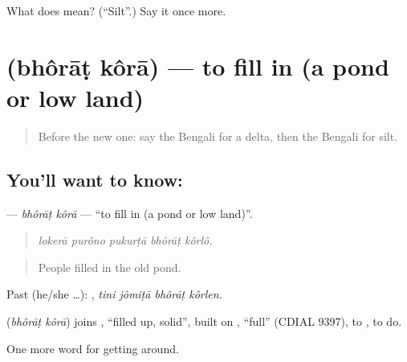 \begin{tcolorbox}[breakable,colback=teal!4,colframe=teal!35!black,title={Before you move on}]
What does  mean? (\textquotedblleft{}Silt\textquotedblright{}.) Say it once more.
\end{tcolorbox}
\section[\texorpdfstring{\bn{ভরাট} \bn{করা} (bhôrāṭ kôrā)}{ভরাট করা (bhôrāṭ kôrā)}]{  (bhôrāṭ kôrā) — to fill in (a pond or low land)}

\label{lesson:BN-C431-bhorat-kora}



\begin{quote}
Before the new one: say the Bengali for a delta, then the Bengali for silt.
\end{quote}

\subsection*{You'll want to know:  }
\textbf{ } — \emph{bhôrāṭ kôrā} — \textquotedblleft{}to fill in (a pond or low land)\textquotedblright{}.

\begin{quote}
    
\end{quote}

\begin{quote}
\emph{lokerā purôno pukurṭā bhôrāṭ kôrlô.}
\end{quote}

\begin{quote}
People filled in the old pond.
\end{quote}

Past (he/she …):    , \emph{tini jômiṭā bhôrāṭ kôrlen}.

\begin{cousinweb}
\textbf{ } (\emph{bhôrāṭ kôrā}) joins , \textquotedblleft{}filled up, solid\textquotedblright{}, built on \textbf{}, \textquotedblleft{}full\textquotedblright{} (CDIAL 9397), to , to do.
\end{cousinweb}

\begin{grammarlens}[title={What you've built}]
One more word for getting around.
\end{grammarlens}

